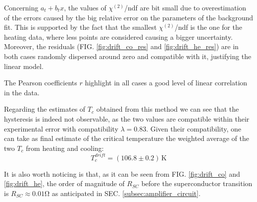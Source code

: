 \documentclass[rmp,10pt,onecolumn,fleqn,notitlepage]{revtex4-1}
\begin{document}
Concerning $a_t + b_t x$, the values of $\chi^{(2)}$/ndf are bit small due to overestimation of the errors caused by the big relative error on the parameters of the background fit. This is supported by the fact that the smallest $\chi^{(2)}$/ndf is the one for the heating data, where less points are considered causing a bigger uncertainty. Moreover, the residuals (FIG. \ref{fig:drift_co_res} and \ref{fig:drift_he_res}) are in both cases randomly dispersed around zero and compatible with it, justifying the linear model.

The Pearson coefficients $r$ highlight in all cases a good level of linear correlation in the data.

Regarding the estimates of $T_c$ obtained from this method we can see that the hysteresis is indeed not observable, as the two values are compatible within their experimental error with compatibility $\lambda = 0.83$. Given their compatibility, one can take as final estimate of the critical temperature the weighted average of the two $T_c$ from heating and cooling:
\begin{equation*}
    T_c^{drift} = (106.8 \pm 0.2) \, \si{\kelvin}
\end{equation*}

It is also worth noticing is that, as it can be seen from FIG. \ref{fig:drift_co} and \ref{fig:drift_he}, the order of magnitude of $R_{SC}$ before the superconductor transition is $R_{SC} \approx 0.01 \si{\ohm}$ as anticipated in SEC. \ref{subsec:amplifier_circuit}.
\end{document}
